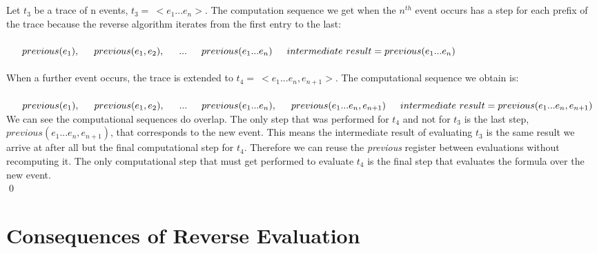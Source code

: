 \begin{myEx}\RRH\\
\\
Let $t_3$ be a trace of n events, $t_3 =\ <e_1 ... e_n>$.  The computation sequence we get when the $n^{th}$ event occurs has a step for each prefix of the trace because the reverse algorithm iterates from the first entry to the last:\\
\\$
\indent previous(e_1),\\
\indent previous(e_1, e_2),\\
\indent ...\\
\indent previous(e_1 ... e_n)\\
\\
\indent intermediate\ result = previous(e_1 ... e_n)$\\
\\
\noindent 
When a further event occurs, the trace is extended to $t_4 =\ <e_1 ... e_n, e_{n+1}>$.  The computational sequence we obtain is:\\
\\$
\indent previous(e_1),\\
\indent previous(e_1, e_2),\\
\indent ...\\
\indent previous(e_1 ... e_n),\\
\indent previous(e_1 ... e_n, e_{n+1})\\
\\
\indent intermediate\ result = previous(e_1 ... e_n, e_{n+1})\\
$\\
We can see the computational sequences do overlap.  The only step that was performed for $t_4$ and not for $t_3$ is the last step, $previous(e_1 ... e_n, e_{n+1})$, that corresponds to the new event.  This means the intermediate result of evaluating $t_3$ is the same result we arrive at after all but the final computational step for $t_4$.  Therefore we can reuse the \textit{previous} register between evaluations without recomputing it.  The only computational step that must get performed to evaluate $t_4$ is the final step that evaluates the formula over the new event.\\
\qed
\end{myEx}

\section{Consequences of Reverse Evaluation}
\label{sec:ReverseCollusionFormula}

